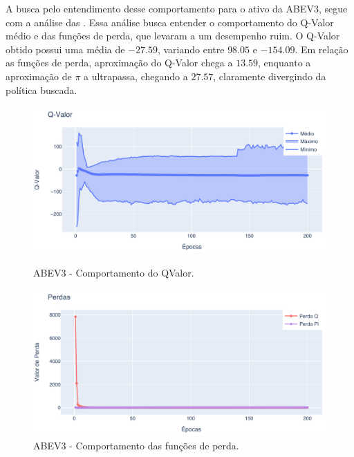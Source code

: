 A busca pelo entendimento desse comportamento para o ativo da ABEV3, segue com a análise das . Essa análise busca entender o comportamento do Q-Valor médio e das funções de perda, que levaram a um desempenho ruim. O Q-Valor obtido possui uma média de $-27.59$, variando entre $98.05$ e $-154.09$. Em relação as funções de perda, aproximação do Q-Valor chega a $13.59$, enquanto a aproximação de $\pi$ a ultrapassa, chegando a $27.57$, claramente divergindo da política buscada.

\begin{figure}[htbp]
    \centering 
    \begin{minipage}[b]{0.45\linewidth}
        \includegraphics[width=\linewidth]{img/ddpg/abev3/clean/qval}
        \caption{ABEV3 - Comportamento do QValor.} 
        \label{abev_clean_qval}
    \end{minipage}
    \quad
    \begin{minipage}[b]{0.45\linewidth}
        \includegraphics[width=\linewidth]{img/ddpg/abev3/clean/loss}
        \caption{ABEV3 - Comportamento das funções de perda.}
        \label{abev_clean_loss}
    \end{minipage}
\end{figure}

